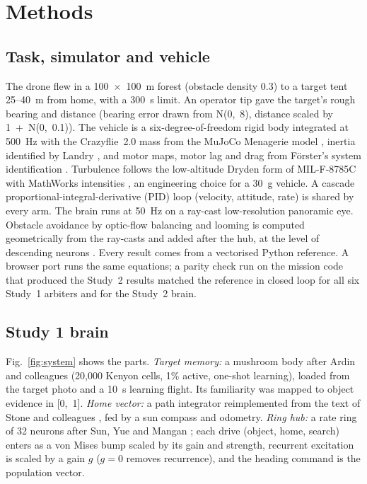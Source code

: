 \documentclass[10pt,twocolumn]{article}
\begin{document}
\section{Methods}

\subsection{Task, simulator and vehicle}
The drone flew in a 100~$\times$~100~m forest (obstacle density 0.3) to a target tent 25--40~m from home, with a 300~s limit. An operator tip gave the target's rough bearing and distance (bearing error drawn from N(0,~8\textdegree), distance scaled by 1~+~N(0,~0.1)). The vehicle is a six-degree-of-freedom rigid body integrated at 500~Hz with the Crazyflie~2.0 mass from the MuJoCo Menagerie model \citep{menagerie2022,mujoco2012}, inertia identified by Landry \citep{landry2015}, and motor maps, motor lag and drag from Förster's system identification \citep{forster2015}. Turbulence follows the low-altitude Dryden form of MIL-F-8785C \citep{milf87851980} with MathWorks intensities \citep{mathworks2026}, an engineering choice for a 30~g vehicle. A cascade proportional-integral-derivative (PID) loop (velocity, attitude, rate) is shared by every arm. The brain runs at 50~Hz on a ray-cast low-resolution panoramic eye. Obstacle avoidance by optic-flow balancing and looming is computed geometrically from the ray-casts and added after the hub, at the level of descending neurons \citep{rayshubskiy2025}. Every result comes from a vectorised Python reference. A browser port runs the same equations; a parity check run on the mission code that produced the Study~2 results matched the reference in closed loop for all six Study~1 arbiters and for the Study~2 brain.

\subsection{Study 1 brain}
Fig.~\ref{fig:system} shows the parts. \emph{Target memory:} a mushroom body after Ardin and colleagues \citep{ardin2016} (20,000 Kenyon cells, 1\% active, one-shot learning), loaded from the target photo and a 10~s learning flight. Its familiarity was mapped to object evidence in [0,~1]. \emph{Home vector:} a path integrator reimplemented from the text of Stone and colleagues \citep{stone2017}, fed by a sun compass and odometry. \emph{Ring hub:} a rate ring of 32 neurons after Sun, Yue and Mangan \citep{sunmangan2018,sun2020}; each drive (object, home, search) enters as a von Mises bump scaled by its gain and strength, recurrent excitation is scaled by a gain $g$ ($g=0$ removes recurrence), and the heading command is the population vector.
\end{document}
